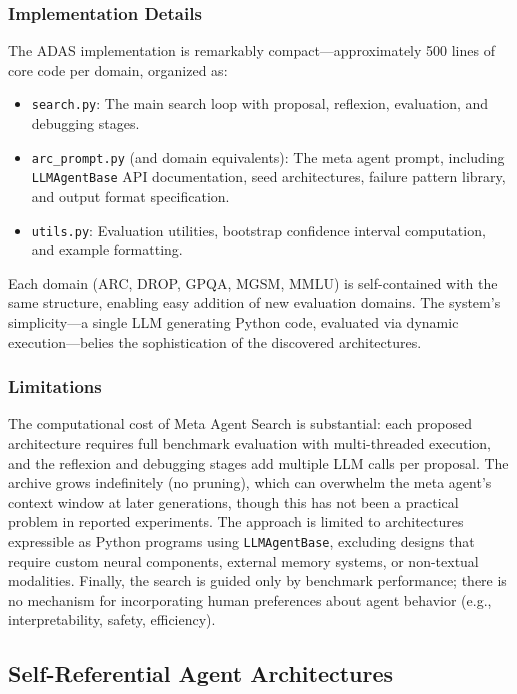 \subsubsection{Implementation Details}

The ADAS implementation is remarkably compact---approximately 500 lines of core code per domain, organized as:
\begin{itemize}
\item \texttt{search.py}: The main search loop with proposal, reflexion, evaluation, and debugging stages.
\item \texttt{arc\_prompt.py} (and domain equivalents): The meta agent prompt, including \texttt{LLMAgentBase} API documentation, seed architectures, failure pattern library, and output format specification.
\item \texttt{utils.py}: Evaluation utilities, bootstrap confidence interval computation, and example formatting.
\end{itemize}

Each domain (ARC, DROP, GPQA, MGSM, MMLU) is self-contained with the same structure, enabling easy addition of new evaluation domains. The system's simplicity---a single LLM generating Python code, evaluated via dynamic execution---belies the sophistication of the discovered architectures.

\subsubsection{Limitations}

The computational cost of Meta Agent Search is substantial: each proposed architecture requires full benchmark evaluation with multi-threaded execution, and the reflexion and debugging stages add multiple LLM calls per proposal. The archive grows indefinitely (no pruning), which can overwhelm the meta agent's context window at later generations, though this has not been a practical problem in reported experiments. The approach is limited to architectures expressible as Python programs using \texttt{LLMAgentBase}, excluding designs that require custom neural components, external memory systems, or non-textual modalities. Finally, the search is guided only by benchmark performance; there is no mechanism for incorporating human preferences about agent behavior (e.g., interpretability, safety, efficiency).

\subsection{Self-Referential Agent Architectures}
\label{sec:self-referential}


